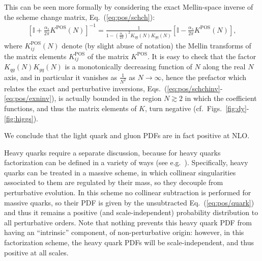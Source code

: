 This can be seen more formally by considering the exact Mellin-space
inverse of the scheme change matrix, Eq.~(\ref{eq:pos/schch}):
\begin{align}\label{eq:pos/exninv}
\left[\mathbb{I}
  +\frac{\alpha_s}{2\pi}  K^{\textrm{POS}}(N) \right] ^{-1}=
\frac{1}{1-\left(\frac{\alpha_s}{2\pi}\right)^2 K_{qg}(N)K_{gq}(N) } \left[\mathbb{I}
  -\frac{\alpha_s}{2\pi}  K^{\textrm{POS}}(N)\right],
\end{align}
where $K^{\textrm{POS}}_{ij}(N)$ denote (by slight abuse of notation) the Mellin
transforms of the matrix elements $K^{\textrm{POS}}_{ij}$ of the matrix
$K^{\textrm{POS}}$.
It is easy to check that the factor $ K_{qg}(N)K_{gq}(N)$ is a
monotonically decreasing function of $N$ along the real $N$ axis, and
in particular it vanishes as $\frac{1}{N^2}$ as $N\to\infty$, hence
the prefactor which relates the exact and perturbative inversions,
Eqs.~(\ref{eq:pos/schchinv}-\ref{eq:pos/exninv}), is actually bounded in the
region $N\gtrsim 2$ in which the \msbar{} coefficient functions, and
thus the matrix elements of $K$, turn negative (cf.\ Figs.~\ref{fig:dy}-\ref{fig:higgs}). 

We conclude that the light quark and gluon \msbar{} PDFs are in fact positive
at NLO.

Heavy quarks require a separate discussion, because for heavy quarks \msbar{}
factorization can be defined in a variety of ways (see
e.g.~\cite{Forte:2010ta}).
Specifically, heavy quarks can be treated in a
massive scheme, in which   collinear singularities
associated to them are regulated by their mass, so they decouple from
perturbative evolution. In this scheme no collinear subtraction is
performed for massive quarks, so their PDF is given by the
unsubtracted 
Eq.~(\ref{eq:pos/quark})  and thus it remains a  positive (and
scale-independent) probability distribution to all perturbative
orders. Note that nothing prevents this heavy quark PDF from having an
``intrinsic''  component, of non-perturbative origin: however, in this
factorization scheme, the heavy quark PDFs will be scale-independent,
and thus positive at all scales.

